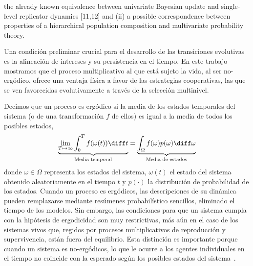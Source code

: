 \documentclass[a4paper,10pt]{article}
\begin{document}
the already
known equivalence between univariate Bayesian update and single-level replicator dynamics [11,12]
and (ii) a possible correspondence between properties of a hierarchical population composition and
multivariate probability theory.




Una condición preliminar crucial para el desarrollo de las transiciones evolutivas es la alineación de intereses y su persistencia en el tiempo.
En este trabajo mostramos que el proceso multiplicativo al que está sujeto la vida, al ser no-ergódico, ofrece una ventaja física a favor de las estrategias cooperativas, las que se ven favorecidas evolutivamente a través de la selección multinivel.

Decimos que un proceso es ergódico si la media de los estados temporales del sistema (o de una transformación $f$ de ellos) es igual a la media de todos los posibles estados,
\begin{equation}
 \underbrace{\lim_{T \mapsto \infty} \int_0^T f(\omega(t)) \diff t}_{\text{Media temporal}}  = \underbrace{\int_{\Omega} f(\omega)p(\omega) \diff\omega}_{\text{Media de estados}}
\end{equation}
donde $\omega \in \Omega$ representa los estados del sistema, $\omega(t)$ el estado del sistema obtenido aleatoriamente en el tiempo $t$ y $p(\cdot)$ la distribución de probabilidad de los estados.
Cuando un proceso es ergódicos, las descripciones de su dinámica pueden remplazarse mediante resúmenes probabilístico sencillos, eliminado el tiempo de los modelos.
Sin embargo, las condiciones para que un sistema cumpla con la hipótesis de ergodicidad son muy restrictivas, más aún en el caso de los sistemas vivos que, regidos por procesos multiplicativos de reproducción y supervivencia, están fuera del equilibrio.
Esta distinción es importante porque cuando un sistema es no-ergódicos, lo que le ocurre a los agentes individuales en el tiempo no coincide con la esperado según los posibles estados del sistema~\cite{peters2019-ergodicityEconomics}.
\end{document}
